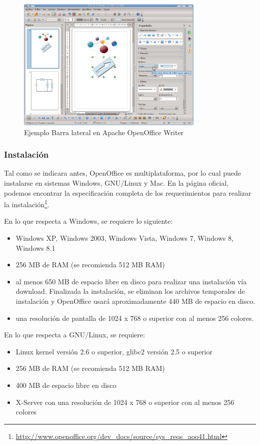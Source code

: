 \documentclass[12pt]{article}
\begin{document}
\begin{itemize}
\begin{figure}[H]
\centering
\includegraphics[width=0.8\textwidth]{barraLateralDrawOO.png}
\renewcommand{\figurename}{Fig.}
\caption{Ejemplo Barra lateral en Apache OpenOffice Writer}
\label{contexto:figura}
\end{figure}

\end{itemize}

\subsubsection{Instalación}

Tal como se indicara antes, OpenOffice es multiplataforma, por lo cual puede instalarse en sistemas Windows, GNU/Linux y Mac. En la página oficial, podemos encontrar la especificación completa de los requerimientos para realizar la instalación\footnote{\url{http://www.openoffice.org/dev\_docs/source/sys\_reqs\_aoo41.html}}. 

En lo que respecta a Windows, se requiere lo siguiente:
\begin{itemize}
\item Windows XP, Windows 2003, Windows Vista, Windows 7, Windows 8, Windows 8.1
\item 256 MB de RAM (se recomienda 512 MB RAM)
\item al menos 650 MB de espacio libre en disco para realizar una instalación vía download. Finalizada la instalación, se eliminan los archivos temporales de instalación y OpenOffice usará aproximadamente 440 MB de espacio en disco.
\item una resolución de pantalla de 1024 x 768 o superior con al menos 256 colores.
\end{itemize}

En lo que respecta a GNU/Linux, se requiere:
\begin{itemize}
\item Linux kernel versión 2.6 o superior, glibc2 versión 2.5 o superior
\item 256 MB de RAM (se recomienda 512 MB RAM)
\item 400 MB de espacio libre en disco
\item X-Server con una resolución de 1024 x 768 o superior con al menos 256 colores
\end{itemize}
\end{document}
